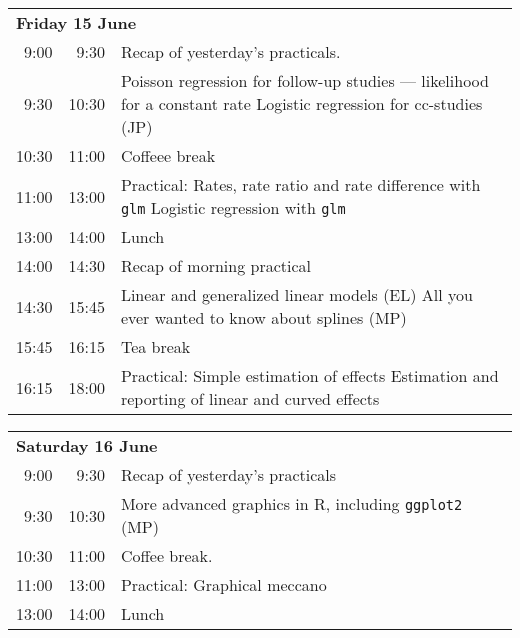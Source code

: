 \noindent
\begin{tabular}{r@{ -- }rp{13cm}}
\multicolumn{3}{l}{\bf Friday 15 June} \\
 9:00 &  9:30 & Recap of yesterday's practicals. \\
 9:30 & 10:30 & Poisson regression for follow-up studies ---
                likelihood for a constant rate \newline
                Logistic regression for cc-studies (JP) \\
10:30 & 11:00 & Coffeee break \\
11:00 & 13:00 & Practical: Rates, rate ratio and rate difference with \texttt{glm}\newline
                Logistic regression with \texttt{glm} \\
13:00 & 14:00 & Lunch \\
14:00 & 14:30 & Recap of morning practical \\
14:30 & 15:45 & Linear and generalized linear models (EL) \newline
                All you ever wanted to know about splines (MP) \\
15:45 & 16:15 & Tea break\\
16:15 & 18:00 & Practical: Simple estimation of effects \newline
                Estimation and reporting of linear and curved effects \\[1em]
\end{tabular}

\noindent
\begin{tabular}{r@{ -- }rp{13cm}}
 \multicolumn{3}{l}{\bf Saturday 16 June} \\
 9:00 &  9:30 & Recap of yesterday's practicals \\
 9:30 & 10:30 & More advanced graphics in R, including \texttt{ggplot2} (MP)\\
10:30 & 11:00 & Coffee break. \\
11:00 & 13:00 & Practical: Graphical meccano \\
13:00 & 14:00 & Lunch\\[1em]
\end{tabular}

